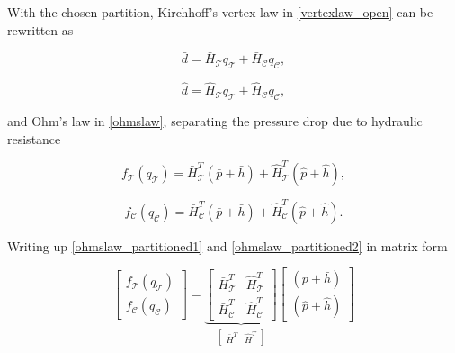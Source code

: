 With the chosen partition, Kirchhoff's vertex law in \eqref{vertexlaw_open} can be rewritten as

\begin{equation}
  \label{vertexlaw_partitioned1}
  \bar{d} = \bar{H}_{\mathcal{T}} q_{\mathcal{T}} + \bar{H}_{\mathcal{C}} q_{\mathcal{C}},
\end{equation}

\begin{equation}
  \label{vertexlaw_partitioned2}
  \hat{d} = \hat{H}_{\mathcal{T}} q_{\mathcal{T}} + \hat{H}_{\mathcal{C}} q_{\mathcal{C}},
\end{equation}

and Ohm's law in \eqref{ohmslaw}, separating the pressure drop due to hydraulic resistance

\begin{equation}
  \label{ohmslaw_partitioned1}
  f_{\mathcal{T}}(q_\mathcal{T}) = \bar{H}^T_{\mathcal{T}} (\bar{p} + \bar{h}) + \hat{H}^T_{\mathcal{T}} (\hat{p} + \hat{h}),
\end{equation}

\begin{equation}
  \label{ohmslaw_partitioned2}
  f_{\mathcal{C}}(q_\mathcal{C}) = \bar{H}^T_{\mathcal{C}} (\bar{p} + \bar{h}) + \hat{H}^T_{\mathcal{C}} (\hat{p} + \hat{h}).
\end{equation}

Writing up \eqref{ohmslaw_partitioned1} and \eqref{ohmslaw_partitioned2} in matrix form

\begin{equation}
\label{ohmslaw_matrixform}
 \begin{bmatrix} 
 f_{\mathcal{T}}(q_\mathcal{T}) \\[3pt]
 f_{\mathcal{C}}(q_\mathcal{C}) 
 \end{bmatrix}
 =
  \underbrace{\begin{bmatrix}
   \bar{H}^T_{\mathcal{T}} & \hat{H}^T_{\mathcal{T}} \\[3pt]
   \bar{H}^T_{\mathcal{C}} & \hat{H}^T_{\mathcal{C}} 
   \end{bmatrix}}_{\begin{bmatrix} 
                  \bar{H}^T & \hat{H}^T 
                  \end{bmatrix}}
   \begin{bmatrix} 
 (\bar{p} + \bar{h}) \\[3pt] 
 (\hat{p} + \hat{h}) 
 \end{bmatrix}
\end{equation}


